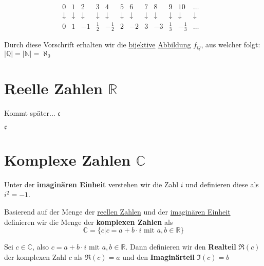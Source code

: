 \documentclass[../../main.tex]{subfiles}
\begin{document}
\begin{itemize}
			$$			
			\begin{matrix}
			0 & 1 & 2           & 3 & 4           & 5 & 6 & 7 & 8 & 9 & 10 & \dots \\
			\downarrow & \downarrow & \downarrow & \downarrow & \downarrow & \downarrow & \downarrow & \downarrow & \downarrow & \downarrow & \downarrow & \downarrow & \\
			0 & 1 & -1 & \frac{1}{2} & -\frac{1}{2} & 2 & -2 & 3 & -3 & \frac{1}{3} & - \frac{1}{3} & \dots
			\end{matrix}
			$$
			
			Durch diese Vorschrift erhalten wir die \hyperref[def:Bijektiv]{bijektive} \hyperref[def:Abbildung]{Abbildung} $f_Q$, aus welcher folgt: $|\mathbb{Q}| = |\mathbb{N}| = \aleph_0$
		
		\end{itemize}
		
		\section{Reelle Zahlen $\mathbb{R}$}
		Kommt später...
		$\mathfrak{c}$
		
		\begin{definition}
			\label{def:ReelleZahlen}
		\end{definition}
	
		\begin{definition}
			\label{def:überabzählbarUnendlich}
			$\mathfrak{c}$
		\end{definition}
		
		
		
		\section{Komplexe Zahlen $\mathbb{C}$}
			\begin{definition}
				\label{def:imaginäreEinheit}
				Unter der \textbf{imaginären Einheit} verstehen wir die Zahl $i$ und definieren diese als $i^2 = -1$. 
			\end{definition}
		
			\begin{definition}
				\label{def:KomplexeZahlen}
				Basierend auf der Menge der \hyperref[def:ReelleZahlen]{reellen Zahlen} und der \hyperref[def:imaginäreEinheit]{imaginären Einheit} definieren wir die Menge der \textbf{komplexen Zahlen} als $$\mathbb{C} = \{c | c = a + b \cdot i \text{ mit } a,b \in \mathbb{R} \}$$
			\end{definition}
		
			\begin{definition}
				\label{def:Realteil}
				\label{def:Imaginärteil}
				Sei $c \in \mathbb{C}$, also $c = a+b \cdot i$ mit $a,b \in \mathbb{R}$. Dann definieren wir den \textbf{Realteil} $\mathfrak{R}(c)$ der komplexen Zahl $c$ als $\mathfrak{R}(c) = a$ und den \textbf{Imaginärteil} $\mathfrak{I}(c)=b$
			\end{definition}
	
\end{document}
